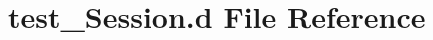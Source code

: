 \hypertarget{test___session_8d}{}\section{test\+\_\+\+Session.\+d File Reference}
\label{test___session_8d}
